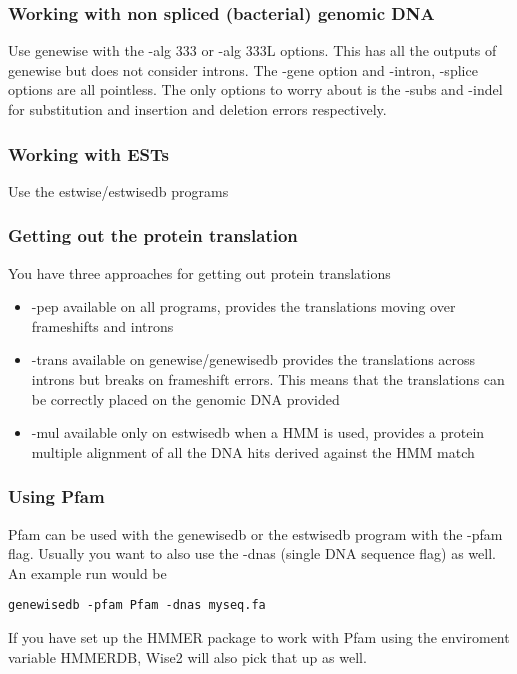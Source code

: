 \documentclass{article}
\begin{document}
\subsubsection{Working with non spliced (bacterial) genomic DNA}

Use genewise with the -alg 333 or -alg 333L options. This has all the
outputs of genewise but does not consider introns. The -gene option
and -intron, -splice options are all pointless. The only options to worry
about is the -subs and -indel for substitution and insertion and deletion
errors respectively.

\subsubsection{Working with ESTs}

Use the estwise/estwisedb programs

\subsubsection{Getting out the protein translation}

You have three approaches for getting out protein translations

\begin{itemize}
\item -pep available on all programs, provides the translations moving
over frameshifts and introns
\item -trans available on genewise/genewisedb provides the translations
across introns but breaks on frameshift errors. This means that the translations can be correctly placed on the genomic DNA provided

\item -mul available only on estwisedb when a HMM is used, provides a
protein multiple alignment of all the DNA hits derived against the HMM
match
\end{itemize}

\subsubsection{Using Pfam}

Pfam can be used with the genewisedb or the estwisedb program with the
-pfam flag. Usually you want to also use the -dnas (single DNA
sequence flag) as well. An example run would be
\begin{verbatim}
genewisedb -pfam Pfam -dnas myseq.fa
\end{verbatim}
If you have set up the HMMER package to work with Pfam using the enviroment
variable HMMERDB, Wise2 will also pick that up as well.
\end{document}
